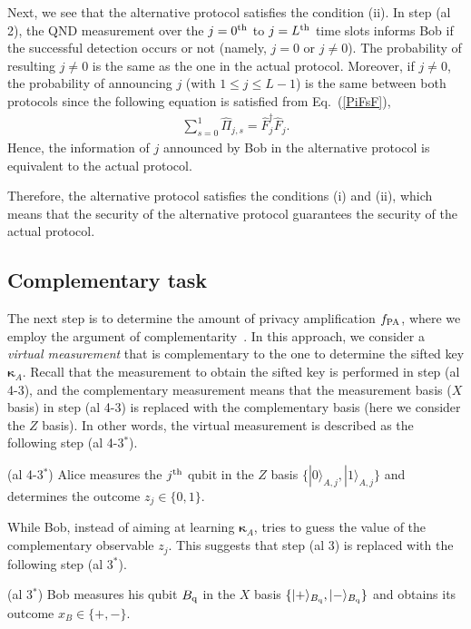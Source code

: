 \documentclass[prl,twocolumn,superscriptaddress,nofootinbib]{revtex4}
\def\U#1{{\rm #1}}
\newcommand{\ket}[1]{| #1 \rangle}
\begin{document}
  Next, we see that the alternative protocol satisfies the condition (ii). 
  In step (al 2), the QND measurement over the $j=0^{\U{th}}$ to $j=L^{\U{th}}$ time slots informs Bob
  if the successful detection occurs or not (namely, $j=0$ or $j\neq0$). 
  The probability of resulting $j\neq0$ is the same as the one in the actual protocol. 
  Moreover, if $j\neq0$, the probability of announcing $j$ (with $1\leq j\leq L-1$) is the same between both protocols
  since the following equation is satisfied from Eq.~(\ref{PiFsF}),
  \begin{align}
\sum^{1}_{s=0}\hat{\Pi}_{j,s}=\hat{F}^{\dagger}_j\hat{F}_j.
  \end{align}
  Hence, the information of $j$ announced by Bob in the alternative protocol is equivalent to the actual protocol. 

  Therefore, the alternative protocol satisfies the conditions (i) and (ii), which means that
  the security of the alternative protocol guarantees the security of the actual protocol.
            
  \subsection{Complementary task}
  \label{sec:complementarity}
  The next step is to determine the amount of privacy amplification $f_{\U{PA}}$, where we employ
  the argument of complementarity~\cite{Koashi2007}. 
  In this approach, we consider a {\it virtual measurement} that is complementary to the one to determine the 
  sifted key $\bm{\kappa}_A$.
  Recall that the measurement to obtain the sifted key is performed in step (al 4-3), and the complementary measurement means that
  the measurement basis ($X$ basis)
  in step (al 4-3) is replaced with the complementary basis (here we consider the $Z$ basis).
  In other words, the virtual measurement is described as the following step (al 4-3$^{\ast}$). 
  
  (al 4-3$^*$) Alice measures the $j^{\U{th}}$ qubit in the $Z$ basis $\{\ket{0}_{A,j},\ket{1}_{A,j}\}$
  and determines the outcome $z_j\in\{0,1\}$.

  While Bob, instead of aiming at learning $\bm{\kappa}_A$, tries to guess the value of the complementary observable $z_j$. 
  This suggests that step (al 3) is replaced with the following step (al 3$^*$). 

  (al 3$^*$) Bob measures his qubit $B_{\U{q}}$ in the $X$ basis $\{\ket{+}_{B_{\U{q}}},\ket{-}_{B_{\U{q}}}\}$ and obtains its outcome 
  $x_B\in\{+,-\}$. 
  
\end{document}
